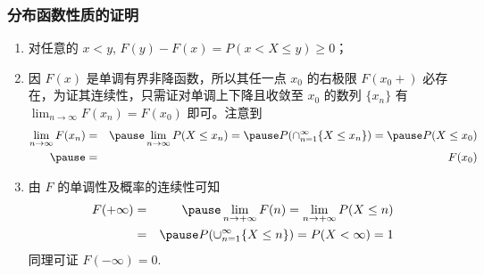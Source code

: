 \documentclass[Prob-All.tex]{subfiles}
\begin{document}
\begin{frame}
	\frametitle{分布函数性质的证明}
	\begin{enumerate}[<+-|alert@+>]
		\item 对任意的 $x<y$, $F (y)-F (x)=P (x< X\le y)\ge 0$；
		\item 因 $F (x)$ 是单调有界非降函数，所以其任一点 $x_0$ 的右极限 $F (x_0+)$ 必存在，为证其连续性，只需证对单调上下降且收敛至 $x_0$ 的数列 $\{x_n\}$ 有 $\lim_{n\rightarrow\infty} F (x_n)=F (x_0)$ 即可。注意到
		      \begin{eqnarray*}
			      \lim_{n\rightarrow\infty}F(x_n)&=&\pause \lim_{n\rightarrow\infty}P(X\le x_n)=\pause P(\cap_{n=1}^\infty \{X\le x_n\})=\pause P(X\le x_0)\\\pause
			      &=&F(x_0)
		      \end{eqnarray*}


		\item 由 $F$ 的单调性及概率的连续性可知
		      \begin{eqnarray*}
			      F(+\infty)&=&\pause \lim_{n\rightarrow +\infty}F(n)=\lim_{n\rightarrow +\infty}P(X\le n)\\
			      &=&\pause P(\cup_{n=1}^\infty \{X\le n\})=P(X<\infty)=1
		      \end{eqnarray*}
		      \pause  同理可证 $F (-\infty)=0$.

	\end{enumerate}


\end{frame}
\end{document}
